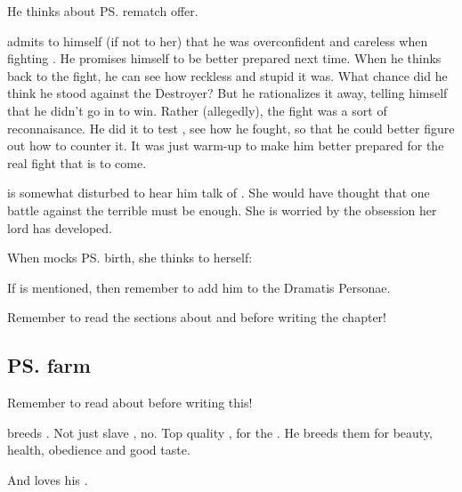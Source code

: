 He thinks about {\ps{\Ishnaruchaefir} rematch offer}. 

\Teshrial{} admits to himself (if not to her) that he was overconfident and careless when fighting \Ishnaruchaefir{}. 
He promises himself to be better prepared next time. 
When he thinks back to the fight, he can see how reckless and stupid it was. 
What chance did he think he stood against the Destroyer? 
But he rationalizes it away, telling himself that he didn't go in to win. 
Rather (allegedly), the fight was a sort of reconnaisance. 
He did it to test \Ishnaruchaefir, see how he fought, so that he could better figure out how to counter it. 
It was just warm-up to make him better prepared for the real fight that is to come. 

\Achsah{} is somewhat disturbed to hear him talk of . 
She would have thought that one battle against the terrible \Ishnaruchaefir{} must be enough. 
She is worried by the obsession her lord has developed. 

When \Teshrial{} mocks \ps{\Achsah} birth, she thinks to herself: 
  
If \Thanatzil{} is mentioned, then remember to add him to the Dramatis Personae. 

Remember to read the sections about  and  before writing the chapter!








\subsection{\ps{\Teshrial} farm}
Remember to read about  before writing this! 

\Teshrial{} breeds \humans. 
Not just slave \humans, no. 
Top quality \humans{}, for the . 
He breeds them for beauty, health, obedience and good taste. 


And \Teshrial{} loves his \humans. 

